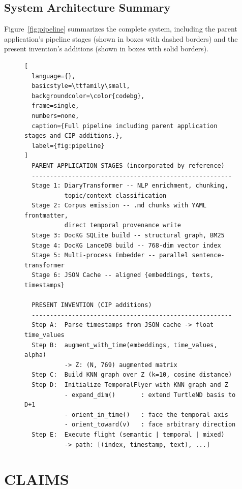 \documentclass[12pt,letterpaper]{article}
\begin{document}
\subsection{System Architecture Summary}

Figure~\ref{fig:pipeline} summarizes the complete system, including the parent
application's pipeline stages (shown in boxes with dashed borders) and the
present invention's additions (shown in boxes with solid borders).

\begin{figure}[H]
\begin{lstlisting}[
  language={},
  basicstyle=\ttfamily\small,
  backgroundcolor=\color{codebg},
  frame=single,
  numbers=none,
  caption={Full pipeline including parent application stages and CIP additions.},
  label={fig:pipeline}
]
  PARENT APPLICATION STAGES (incorporated by reference)
  -------------------------------------------------------
  Stage 1: DiaryTransformer -- NLP enrichment, chunking,
           topic/context classification
  Stage 2: Corpus emission -- .md chunks with YAML frontmatter,
           direct temporal provenance write
  Stage 3: DocKG SQLite build -- structural graph, BM25
  Stage 4: DocKG LanceDB build -- 768-dim vector index
  Stage 5: Multi-process Embedder -- parallel sentence-transformer
  Stage 6: JSON Cache -- aligned {embeddings, texts, timestamps}

  PRESENT INVENTION (CIP additions)
  -------------------------------------------------------
  Step A:  Parse timestamps from JSON cache -> float time_values
  Step B:  augment_with_time(embeddings, time_values, alpha)
           -> Z: (N, 769) augmented matrix
  Step C:  Build KNN graph over Z (k=10, cosine distance)
  Step D:  Initialize TemporalFlyer with KNN graph and Z
           - expand_dim()       : extend TurtleND basis to D+1
           - orient_in_time()   : face the temporal axis
           - orient_toward(v)   : face arbitrary direction
  Step E:  Execute flight (semantic | temporal | mixed)
           -> path: [(index, timestamp, text), ...]
\end{lstlisting}
\end{figure}

\section{CLAIMS}
\end{document}
